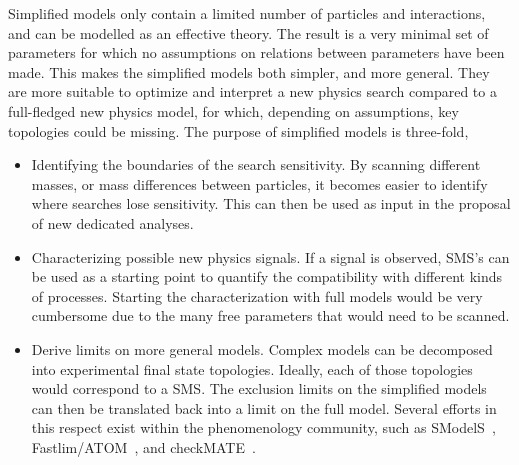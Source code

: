 Simplified models only contain a limited number of particles and interactions, and can be modelled
as an effective theory. 
The result is a very minimal set of parameters for which no assumptions on relations between
parameters have been made. This makes the simplified models both simpler, and more general.
They are more suitable to optimize and interpret a new physics search compared to a full-fledged
new physics model, for which, depending on assumptions, key topologies could be missing.
The purpose of simplified models is three-fold,
\begin{itemize}
  \item Identifying the boundaries of the search sensitivity. By scanning different masses, or mass
differences between particles, it becomes easier to identify where searches lose sensitivity. This
can then be used as input in the proposal of new dedicated analyses. 

  \item Characterizing possible new physics signals. If a signal is observed, SMS's can be used as
a starting point to quantify the compatibility with different kinds of processes. Starting the
characterization with full models would be very cumbersome due to the many free
parameters that would need to be scanned.

\item Derive limits on more general models. Complex models can be decomposed into experimental
final state topologies. Ideally, each of those topologies would correspond to a SMS. The exclusion
limits on the simplified models can then be translated back into a limit on the full model. 
Several efforts in this respect exist within the phenomenology community, such as
SModelS~\cite{Kraml:2013mwa,Kraml:2014sna}, Fastlim/ATOM~\cite{Papucci:2014rja}, and
checkMATE~\cite{Kim:2015wza}.
\end{itemize}


